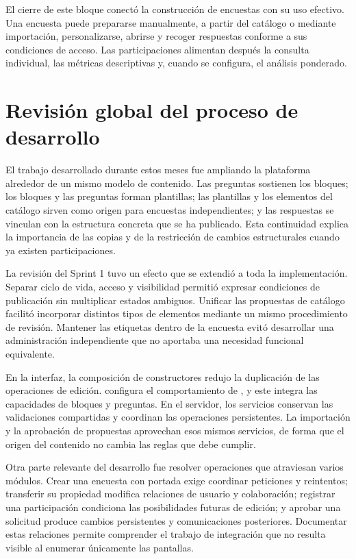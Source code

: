 \documentclass[11pt,a4paper]{report}
\newcommand{\code}[1]{\texttt{\small\detokenize{#1}}}
\begin{document}
El cierre de este bloque conectó la construcción de encuestas con su uso efectivo. Una encuesta puede prepararse manualmente, a partir del catálogo o mediante importación, personalizarse, abrirse y recoger respuestas conforme a sus condiciones de acceso. Las participaciones alimentan después la consulta individual, las métricas descriptivas y, cuando se configura, el análisis ponderado.

\section{Revisión global del proceso de desarrollo}

El trabajo desarrollado durante estos meses fue ampliando la plataforma alrededor de un mismo modelo de contenido. Las preguntas sostienen los bloques; los bloques y las preguntas forman plantillas; las plantillas y los elementos del catálogo sirven como origen para encuestas independientes; y las respuestas se vinculan con la estructura concreta que se ha publicado. Esta continuidad explica la importancia de las copias y de la restricción de cambios estructurales cuando ya existen participaciones.

La revisión del Sprint 1 tuvo un efecto que se extendió a toda la implementación. Separar ciclo de vida, acceso y visibilidad permitió expresar condiciones de publicación sin multiplicar estados ambiguos. Unificar las propuestas de catálogo facilitó incorporar distintos tipos de elementos mediante un mismo procedimiento de revisión. Mantener las etiquetas dentro de la encuesta evitó desarrollar una administración independiente que no aportaba una necesidad funcional equivalente.

En la interfaz, la composición de constructores redujo la duplicación de las operaciones de edición. \code{SurveyBuilder} configura el comportamiento de \code{TemplateBuilder}, y este integra las capacidades de bloques y preguntas. En el servidor, los servicios conservan las validaciones compartidas y coordinan las operaciones persistentes. La importación y la aprobación de propuestas aprovechan esos mismos servicios, de forma que el origen del contenido no cambia las reglas que debe cumplir.

Otra parte relevante del desarrollo fue resolver operaciones que atraviesan varios módulos. Crear una encuesta con portada exige coordinar peticiones y reintentos; transferir su propiedad modifica relaciones de usuario y colaboración; registrar una participación condiciona las posibilidades futuras de edición; y aprobar una solicitud produce cambios persistentes y comunicaciones posteriores. Documentar estas relaciones permite comprender el trabajo de integración que no resulta visible al enumerar únicamente las pantallas.
\end{document}
